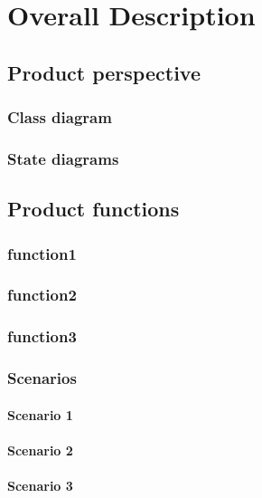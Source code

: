 \chapter{Overall Description}

\section{Product perspective}


\subsection{Class diagram}

\clearpage

\subsection{State diagrams}

\clearpage

\section{Product functions}\label{desc:prodFunc}

\subsection{function1}
\subsection{function2}
\subsection{function3}
	
\clearpage

\subsection{Scenarios}

\subsubsection{Scenario 1}\label{sc:first}
\subsubsection{Scenario 2}\label{sc:second}
\subsubsection{Scenario 3}\label{sc:third}


